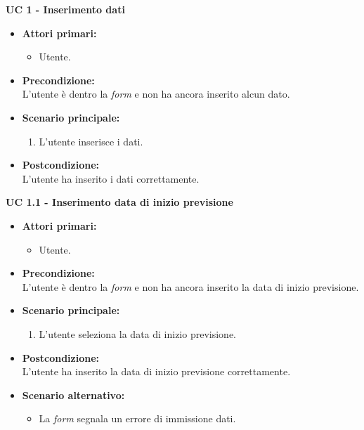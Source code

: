 \noindent \textbf{\large UC 1 - Inserimento dati}
\label{uc:inserimento-dati}
\begin{itemize}

	\item \textbf{Attori primari: }
		\begin{itemize}
			\item Utente.
		\end{itemize}

	\item \textbf{Precondizione: }\\[0.3cm]
		L'utente è dentro la \textit{form} e non ha ancora inserito alcun dato.

	\item \textbf{Scenario principale: }
		\begin{enumerate}
			\item L'utente inserisce i dati.
		\end{enumerate}
		

	\item \textbf{Postcondizione: }\\[0.3cm]
		L'utente ha inserito i dati correttamente.

\end{itemize}

\vspace{0.5cm}


\noindent \textbf{\large UC 1.1 - Inserimento data di inizio previsione}
\label{uc:inserimento-data-inizio-prev}
\begin{itemize}

	\item \textbf{Attori primari: }
		\begin{itemize}
			\item Utente.
		\end{itemize}

	\item \textbf{Precondizione: }\\[0.3cm]
		L'utente è dentro la \textit{form} e non ha ancora inserito la data di inizio previsione.

	\item \textbf{Scenario principale: }
		\begin{enumerate}
			\item L'utente seleziona la data di inizio previsione.
		\end{enumerate}

	\item \textbf{Postcondizione: }\\[0.3cm]
		L'utente ha inserito la data di inizio previsione correttamente.

	\item \textbf{Scenario alternativo: }
		\begin{itemize}
		    \item La \textit{form} segnala un errore di immissione dati.
		\end{itemize}

\end{itemize}

